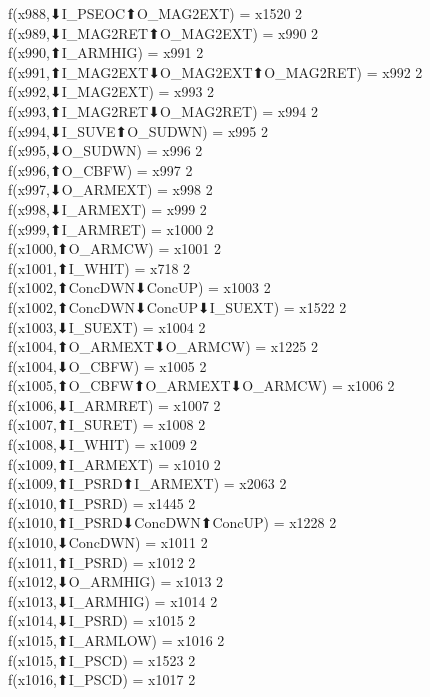 f(x988,⬇I_PSEOC⬆O_MAG2EXT) = x1520 {2} \\
f(x989,⬇I_MAG2RET⬆O_MAG2EXT) = x990 {2} \\
f(x990,⬆I_ARMHIG) = x991 {2} \\
f(x991,⬆I_MAG2EXT⬇O_MAG2EXT⬆O_MAG2RET) = x992 {2} \\
f(x992,⬇I_MAG2EXT) = x993 {2} \\
f(x993,⬆I_MAG2RET⬇O_MAG2RET) = x994 {2} \\
f(x994,⬇I_SUVE⬆O_SUDWN) = x995 {2} \\
f(x995,⬇O_SUDWN) = x996 {2} \\
f(x996,⬆O_CBFW) = x997 {2} \\
f(x997,⬇O_ARMEXT) = x998 {2} \\
f(x998,⬇I_ARMEXT) = x999 {2} \\
f(x999,⬆I_ARMRET) = x1000 {2} \\
f(x1000,⬆O_ARMCW) = x1001 {2} \\
f(x1001,⬆I_WHIT) = x718 {2} \\
f(x1002,⬆ConcDWN⬇ConcUP) = x1003 {2} \\
f(x1002,⬆ConcDWN⬇ConcUP⬇I_SUEXT) = x1522 {2} \\
f(x1003,⬇I_SUEXT) = x1004 {2} \\
f(x1004,⬆O_ARMEXT⬇O_ARMCW) = x1225 {2} \\
f(x1004,⬇O_CBFW) = x1005 {2} \\
f(x1005,⬆O_CBFW⬆O_ARMEXT⬇O_ARMCW) = x1006 {2} \\
f(x1006,⬇I_ARMRET) = x1007 {2} \\
f(x1007,⬆I_SURET) = x1008 {2} \\
f(x1008,⬇I_WHIT) = x1009 {2} \\
f(x1009,⬆I_ARMEXT) = x1010 {2} \\
f(x1009,⬆I_PSRD⬆I_ARMEXT) = x2063 {2} \\
f(x1010,⬆I_PSRD) = x1445 {2} \\
f(x1010,⬆I_PSRD⬇ConcDWN⬆ConcUP) = x1228 {2} \\
f(x1010,⬇ConcDWN) = x1011 {2} \\
f(x1011,⬆I_PSRD) = x1012 {2} \\
f(x1012,⬇O_ARMHIG) = x1013 {2} \\
f(x1013,⬇I_ARMHIG) = x1014 {2} \\
f(x1014,⬇I_PSRD) = x1015 {2} \\
f(x1015,⬆I_ARMLOW) = x1016 {2} \\
f(x1015,⬆I_PSCD) = x1523 {2} \\
f(x1016,⬆I_PSCD) = x1017 {2} \\
